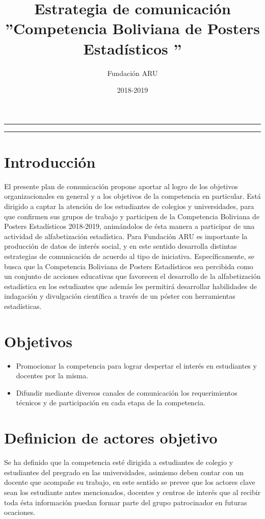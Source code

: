 \documentclass{article}
\title{\textbf{Estrategia de comunicación} \\ ''Competencia Boliviana de Posters Estadísticos ''}
\author{Fundación ARU}
\date{2018-2019 }
\begin{document}
\maketitle

\hrule
\hrule
\newpage

\section{Introducción}

El presente plan de comunicación propone aportar al logro de los objetivos organizacionales en general y a los objetivos de la competencia en particular. Está dirigido a captar la atención de los estudiantes de colegios y universidades, para que confirmen sus grupos de trabajo y participen de la Competencia Boliviana de Posters Estadísticos 2018-2019, animándolos de ésta manera a participar de una actividad de alfabetización estadística.
Para Fundación ARU es importante la producción de datos de interés social, y en este sentido desarrolla distintas estrategias de comunicación de acuerdo al tipo de iniciativa. Específicamente, se busca que la Competencia Boliviana de Posters Estadísticos sea percibida como un conjunto de acciones educativas que favorecen el desarrollo de la alfabetización estadística en los estudiantes que además les permitirá desarrollar habilidades de indagación y divulgación científica a través de un póster con herramientas estadísticas.

\section{Objetivos}


\begin{itemize}
\item Promocionar la competencia para lograr despertar el interés en estudiantes y docentes por la misma. 

\item Difundir mediante diversos canales de comunicación los requerimientos técnicos y de participación en cada etapa de la competencia.
\end{itemize} 

\section{Definicion de actores objetivo}


Se ha definido que la competencia esté dirigida a estudiantes de colegio y estudiantes del pregrado en las universidades, asimismo deben contar con un docente que acompañe su trabajo, en este sentido se prevee que los actores clave sean los estudiante antes mencionados, docentes y centros de interés que al recibir toda ésta información puedan formar parte del grupo patrocinador en futuras ocaciones. \\
\end{document}
